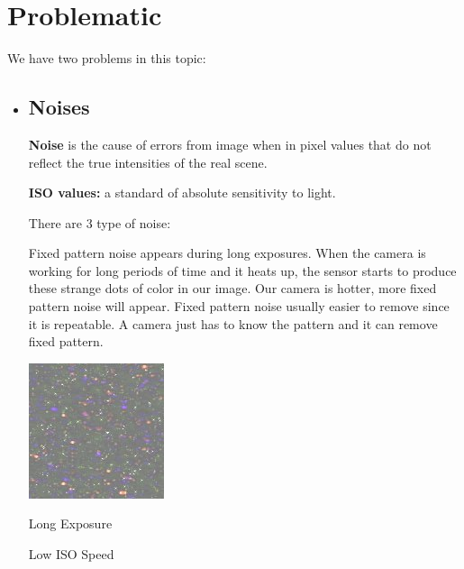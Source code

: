 \vspace*{1cm}



\section{Problematic}
We have two problems in this topic:


\begin{itemize}


\item \subsection*{Noises}
\textbf{Noise} is the cause of errors from image when in pixel values
that do not reflect the true intensities of the real scene.
\vspace{0.3cm}

\textbf{ISO values:} a standard of absolute sensitivity to light.
\vspace{0.3cm}

There are 3 type of noise:

Fixed pattern noise appears during long exposures. When the camera is working for long periods of time and it heats up, the sensor starts to produce these strange dots of color in our image. Our camera is hotter, more fixed pattern noise will appear. Fixed pattern noise usually easier to remove since it is repeatable. A camera just has to know the pattern and it can remove fixed pattern.
\vspace{0.5cm}

\begin{center}
	\includegraphics{fix.png}

Long Exposure

Low ISO Speed
\end{center}
\vspace{0.5cm}



\end{itemize}
